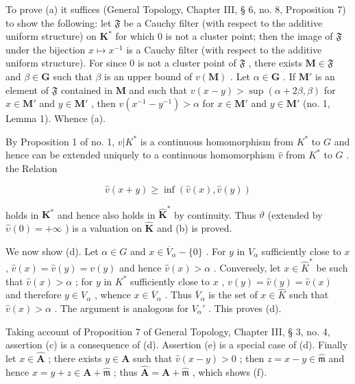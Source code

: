 To prove (a) it suffices (General Topology, Chapter III, § 6, no. 8, Proposition 7) to show the following: let \(\mathfrak{F}\) be a Cauchy filter (with respect to the additive uniform structure) on \(\mathbf{K}^*\) for which 0 is not a cluster point; then the image of \(\mathfrak{F}\) under the bijection \(x \mapsto x^{-1}\) is a Cauchy filter (with respect to the additive uniform structure). For since 0 is not a cluster point of \(\mathfrak{F}\) , there exists \(\mathbf{M} \in \mathfrak{F}\) and \(\beta \in \mathbf{G}\) such that \(\beta\) is an upper bound of \(v(\mathbf{M})\) . Let \(\alpha \in \mathbf{G}\) . If \(\mathbf{M}'\) is an element of \(\mathfrak{F}\) contained in \(\mathbf{M}\) and such that \(v(x - y) > \sup (\alpha + 2\beta, \beta)\) for \(x \in \mathbf{M}'\) and \(y \in \mathbf{M}'\) , then \(v(x^{-1} - y^{-1}) > \alpha\) for \(x \in \mathbf{M}'\) and \(y \in \mathbf{M}'\) (no. 1, Lemma 1). Whence (a).

By Proposition 1 of no. 1, \(v|K^*\) is a continuous homomorphism from \(K^*\) to \(G\) and hence can be extended uniquely to a continuous homomorphism \(\hat{v}\) from \(K^*\) to \(G\) . the Relation

\[
\hat {v} (x + y) \geqslant \inf (\hat {v} (x), \hat {v} (y))
\]

holds in \(\mathbf{K}^*\) and hence also holds in \(\hat{\mathbf{K}}^*\) by continuity. Thus \(\vartheta\) (extended by \(\hat{\upsilon}(0) = +\infty\) ) is a valuation on \(\hat{\mathbf{K}}\) and (b) is proved.

We now show (d). Let \(\alpha \in G\) and \(x \in \overline{V}_{\alpha} - \{0\}\) . For \(y\) in \(V_{\alpha}\) sufficiently close to \(x\) , \(\hat{v}(x) = \hat{v}(y) = v(y)\) and hence \(\hat{v}(x) > \alpha\) . Conversely, let \(x \in \widehat{K}^*\) be such that \(\hat{v}(x) > \alpha\) ; for \(y\) in \(K^*\) sufficiently close to \(x\) , \(v(y) = \hat{v}(y) = \hat{v}(x)\) and therefore \(y \in V_{\alpha}\) , whence \(x \in \overline{V}_{\alpha}\) . Thus \(\overline{V}_{\alpha}\) is the set of \(x \in \widehat{K}\) such that \(\hat{v}(x) > \alpha\) . The argument is analogous for \(V_{\alpha}'\) . This proves (d).

Taking account of Proposition 7 of General Topology, Chapter III, § 3, no. 4, assertion (c) is a consequence of (d). Assertion (e) is a special case of (d). Finally let \(x \in \hat{\mathbf{A}}\) ; there exists \(y \in \mathbf{A}\) such that \(\hat{v}(x - y) > 0\) ; then \(z = x - y \in \hat{\mathfrak{m}}\) and hence \(x = y + z \in \mathbf{A} + \hat{\mathfrak{m}}\) ; thus \(\hat{\mathbf{A}} = \mathbf{A} + \hat{\mathfrak{m}}\) , which shows (f).

